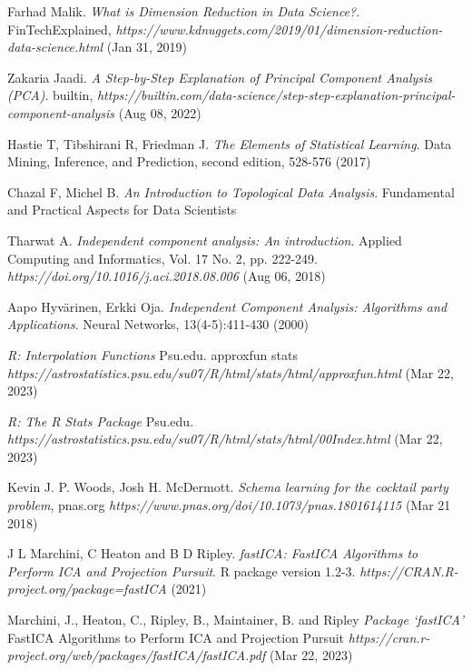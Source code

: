 \newpage
\begin{thebibliography}{99}

    Farhad Malik. \textit{What is Dimension Reduction in Data Science?}. FinTechExplained, \textit{https://www.kdnuggets.com/2019/01/dimension-reduction-data-science.html} (Jan 31, 2019)

    Zakaria Jaadi. \textit{A Step-by-Step Explanation of Principal Component Analysis (PCA)}. builtin, \textit{https://builtin.com/data-science/step-step-explanation-principal-component-analysis} (Aug 08, 2022)

    Hastie T, Tibshirani R, Friedman J. \textit{The Elements of Statistical Learning}.  Data Mining, Inference, and Prediction, second edition, 528-576 (2017)

    Chazal F, Michel B. \textit{An Introduction to Topological Data Analysis}. Fundamental and Practical Aspects for Data Scientists

    Tharwat A. \textit{Independent component analysis: An introduction}. Applied Computing and Informatics, Vol. 17 No. 2, pp. 222-249. \textit{https://doi.org/10.1016/j.aci.2018.08.006} (Aug 06, 2018)

    Aapo Hyvärinen, Erkki Oja. \textit{Independent Component Analysis: Algorithms and Applications}. Neural Networks, 13(4-5):411-430 (2000) 

    \textit{R: Interpolation Functions} Psu.edu. approxfun {stats} \textit{https://astrostatistics.psu.edu/su07/R/html/stats/html/approxfun.html} (Mar 22, 2023)
    
    \textit{R: The R Stats Package} Psu.edu. \textit{https://astrostatistics.psu.edu/su07/R/html/stats/html/00Index.html} (Mar 22, 2023)

    Kevin J. P. Woods, Josh H. McDermott. \textit{Schema learning for the cocktail party problem}, pnas.org \textit{https://www.pnas.org/doi/10.1073/pnas.1801614115} (Mar 21 2018)

    J L Marchini, C Heaton and B D Ripley. \textit{fastICA: FastICA Algorithms to Perform ICA and Projection Pursuit}. R package version 1.2-3. \textit{https://CRAN.R-project.org/package=fastICA} (2021)

    Marchini, J., Heaton, C., Ripley, B., Maintainer, B. and Ripley \textit{Package ‘fastICA’} FastICA Algorithms to Perform ICA and Projection Pursuit \textit{https://cran.r-project.org/web/packages/fastICA/fastICA.pdf } (Mar 22, 2023)


\end{thebibliography}
